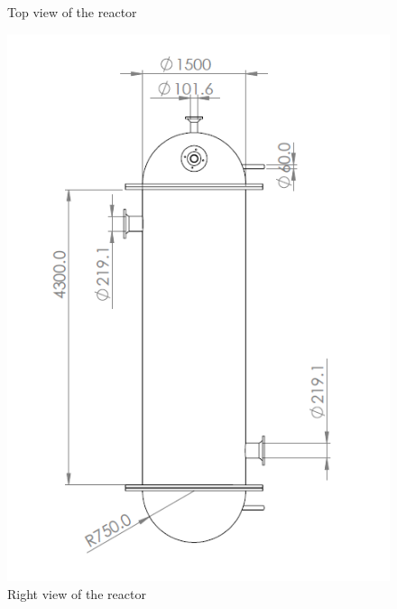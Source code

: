 \begin{figure}[h]
\begin{minipage}[t]{0.4\linewidth}
        \caption{Top view of the reactor}
        \label{fig:reactortop}
    \end{minipage}
\end{figure}
\begin{figure}
    \centering

\end{figure}

\begin{figure}[h]
    \begin{minipage}[t]{0.49\linewidth}
        \includegraphics[width=\linewidth]{chapters/2-reaction/figures/FYD reactor right view with calc.PNG}
        \caption{Right view of the reactor}
        \label{fig:reactorright}
    \end{minipage}\hfill
    \begin{minipage}[t]{0.49\linewidth}

\end{minipage}
\end{figure}
